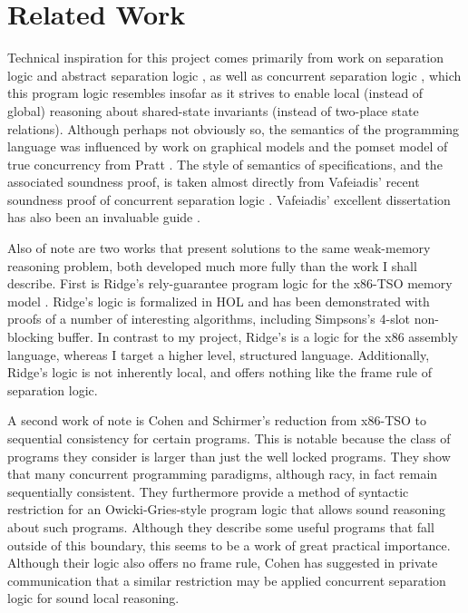 \documentclass[11pt]{article}
\begin{document}
\section{Related Work}

Technical inspiration for this project comes primarily from work on separation logic \cite{DBLP:conf/lics/Reynolds02,DBLP:conf/csl/OHearnRY01,DBLP:journals/bsl/OHearnP99} and abstract separation logic \cite{DBLP:conf/lics/CalcagnoOY07}, as well as concurrent separation logic  \cite{DBLP:journals/tcs/OHearn07,DBLP:journals/tcs/Brookes07}, which this program logic resembles insofar as it strives to enable local (instead of global) reasoning about shared-state invariants (instead of two-place state relations). Although perhaps not obviously so, the semantics of the programming language was influenced by work on graphical models \cite{DBLP:journals/ipl/WehrmanHO09,DBLP:conf/RelMiCS/HoareMSW09,DBLP:journals/jlp/HoareMSW11} and the pomset model of true concurrency from Pratt \cite{DBLP:conf/popl/Pratt82,DBLP:conf/concur/Pratt84}. The style of semantics of specifications, and the associated soundness proof, is taken almost directly from Vafeiadis' recent soundness proof of concurrent separation logic \cite{V11}. Vafeiadis' excellent dissertation has also been an invaluable guide \cite{VafeiadisDissertation}. 

Also of note are two works that present solutions to the same weak-memory reasoning problem, both developed much more fully than the work I shall describe. First is Ridge's rely-guarantee program logic for the x86-TSO memory model \cite{DBLP:conf/vstte/Ridge10}. Ridge's logic is formalized in HOL and has been demonstrated with proofs of a number of interesting algorithms, including Simpsons's 4-slot non-blocking buffer. In contrast to my project, Ridge's is a logic for the x86 assembly language, whereas I target a higher level, structured language. Additionally, Ridge's logic is not inherently local, and offers nothing like the frame rule of separation logic. 

A second work of note is Cohen and Schirmer's \cite{DBLP:conf/itp/CohenS10} reduction from x86-TSO to sequential consistency for certain programs. This is notable because the class of programs they consider is larger than just the well locked programs. They show that many concurrent programming paradigms, although racy, in fact remain sequentially consistent. They furthermore provide a method of syntactic restriction for an Owicki-Gries-style program logic that allows sound reasoning about such programs. Although they describe some useful programs that fall outside of this boundary, this seems to be a work of great practical importance. Although their logic also offers no frame rule, Cohen has suggested in private communication that a similar restriction may be applied concurrent separation logic for sound local reasoning.
\end{document}
